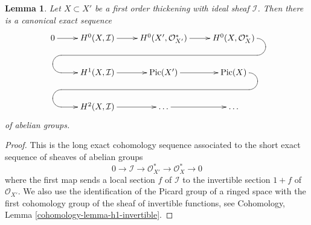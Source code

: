 \documentclass[10pt,a4paper]{amsart}
\theoremstyle{plain}
\newtheorem{lemma}[subsection]{Lemma}
\theoremstyle{definition}
\theoremstyle{remark}
\numberwithin{equation}{subsection}
\def\Pic{\mathop{\mathrm{Pic}}\nolimits}
\begin{document}
\begin{lemma}
\label{lemma-picard-group-first-order-thickening}
Let $X \subset X'$ be a first order thickening
with ideal sheaf $\mathcal{I}$. Then there is a canonical
exact sequence
$$
\xymatrix{
0 \ar[r] &
H^0(X, \mathcal{I}) \ar[r] &
H^0(X', \mathcal{O}_{X'}^*) \ar[r] &
H^0(X, \mathcal{O}^*_X) \ar `r[d] `d[l] `l[llld] `d[dll] [dll] \\
& H^1(X, \mathcal{I}) \ar[r] &
\Pic(X') \ar[r] &
\Pic(X) \ar `r[d] `d[l] `l[llld] `d[dll] [dll] \\
& H^2(X, \mathcal{I}) \ar[r] & \ldots \ar[r] & \ldots
}
$$
of abelian groups.
\end{lemma}

\begin{proof}
This is the long exact cohomology sequence associated to the
short exact sequence of sheaves of abelian groups
$$
0 \to \mathcal{I} \to \mathcal{O}_{X'}^* \to \mathcal{O}_X^* \to 0
$$
where the first map sends a local section $f$ of $\mathcal{I}$
to the invertible section $1 + f$ of $\mathcal{O}_{X'}$.
We also use the identification of the Picard group of a
ringed space with the first cohomology group of the sheaf
of invertible functions, see
Cohomology, Lemma \ref{cohomology-lemma-h1-invertible}.
\end{proof}
\end{document}
